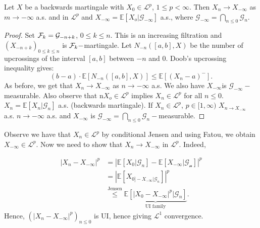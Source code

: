 \documentclass{article}
\begin{document}
\begin{theorem}\label{thm: backwards mg conv theorem}
	Let $ X$ be a backwards martingale with $ X_{0}\in \mathcal{L}^{p} $, $ 1\leq p <\infty$. Then $ X_{n}\to X_{-\infty}$ as $ m\to -\infty$ a.s. and in $ \mathcal{L}^{p} $ and $ X_{-\infty} = \mathbb{E}\left[ X_{o}| \mathcal{G}_{-\infty} \right]$ a.s., where $ \mathcal{G}_{-\infty} =\displaystyle\bigcap_{n\leq 0} \mathcal{G}_{n} $.
\end{theorem}


\begin{proof}
	Set $ \mathcal{F}_{k} = \mathcal{G}_{-n+k}$, $ 0\leq k \leq n$. This is an increasing filtration and $ (X_{-n+k})_{0\leq k \leq n}$ is $ \mathcal{F}_{k}-$martingale. Let $ N_{-n}([a,b], X)$ be the number of upcrossings of the interval $ [a,b]$ between $ -n$ and $ 0$. Doob's upcrossing inequality gives:
	\[
		(b-a)\cdot \mathbb{E}\left[ N_{-n}([a,b], X) \right]\leq \mathbb{E}\left[ (X_{n}-a)^{-} \right].
	\]
As before, we get that $ X_{n}\to X_{-\infty}$ as $ n\to -\infty$ a.s. We also have $ X_{-\infty} $is $ \mathcal{G}_{-\infty}-$measurable. Also observe that n$ X_{o}\in \mathcal{L}^{p} $ implies $ X_{n}\in \mathcal{L}^{p} $ for all $ n\leq 0$.\\ 

 $ X_{n} = \mathbb{E}\left[ X_{n}| \mathcal{G}_{n} \right]$ a.s. (backwards martingale). If $ X_{n}\in \mathcal{L}^{p} $, $ p\in [1,\infty)$ $ X_{n\to X_{-\infty}}$ a.s. $ n\to -\infty$ a.s. and $ X_{-\infty}$ is $ \mathcal{G}_{-\infty} =\displaystyle\bigcap_{n\leq 0} \mathcal{G}_{n}-$measurable.

\end{proof}

Observe we have that $ X_{n}\in \mathcal{L}^{p} $ by conditional Jensen and using Fatou, we obtain
$ X_{-\infty}\in \mathcal{L}^{p} $. Now we need to show that $ X_{n}\to X_{-\infty}$ in $ \mathcal{L}^{p} $. Indeed, 

\[
\begin{array}{ll}
    |X_{n}-X_{-\infty}|^{p} &= |\mathbb{E}\left[ X_{0}| \mathcal{G}_{n} \right]-\mathbb{E}\left[ X_{-\infty}| \mathcal{G_{n}} \right]|^{p} \\
			    & = |\mathbb{E}\left[ X_{0]-X_{-\infty}| \mathcal{G}_{n}} \right]|^{p} \\ 
			    &\stackrel{\text{Jensen}}{\leq}\displaystyle\underbrace{\mathbb{E}\left[ |X_{0}-X_{-\infty}|^{p} | \mathcal{G }_{n}\right]}_{\text{UI family}}. 
\end{array}
\]
Hence, $ (|X_{n}-X_{-\infty}|^{p})_{n\leq 0}$ is UI, hence giving $ \mathcal{L}^{1} $ convergence.\\
\end{document}
